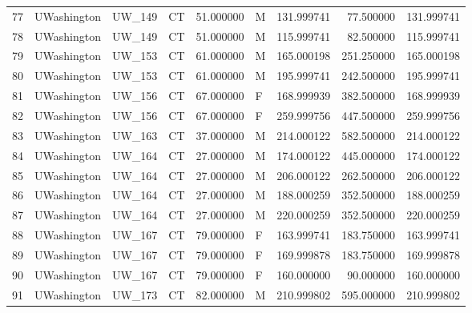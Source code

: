 \begin{tabular}{llllrlrrr}
77     &     UWashington &       UW\_149 &                 CT &  51.000000 &        M &       131.999741 &     77.500000 &  131.999741 \\
78     &     UWashington &       UW\_149 &                 CT &  51.000000 &        M &       115.999741 &     82.500000 &  115.999741 \\
79     &     UWashington &       UW\_153 &                 CT &  61.000000 &        M &       165.000198 &    251.250000 &  165.000198 \\
80     &     UWashington &       UW\_153 &                 CT &  61.000000 &        M &       195.999741 &    242.500000 &  195.999741 \\
81     &     UWashington &       UW\_156 &                 CT &  67.000000 &        F &       168.999939 &    382.500000 &  168.999939 \\
82     &     UWashington &       UW\_156 &                 CT &  67.000000 &        F &       259.999756 &    447.500000 &  259.999756 \\
83     &     UWashington &       UW\_163 &                 CT &  37.000000 &        M &       214.000122 &    582.500000 &  214.000122 \\
84     &     UWashington &       UW\_164 &                 CT &  27.000000 &        M &       174.000122 &    445.000000 &  174.000122 \\
85     &     UWashington &       UW\_164 &                 CT &  27.000000 &        M &       206.000122 &    262.500000 &  206.000122 \\
86     &     UWashington &       UW\_164 &                 CT &  27.000000 &        M &       188.000259 &    352.500000 &  188.000259 \\
87     &     UWashington &       UW\_164 &                 CT &  27.000000 &        M &       220.000259 &    352.500000 &  220.000259 \\
88     &     UWashington &       UW\_167 &                 CT &  79.000000 &        F &       163.999741 &    183.750000 &  163.999741 \\
89     &     UWashington &       UW\_167 &                 CT &  79.000000 &        F &       169.999878 &    183.750000 &  169.999878 \\
90     &     UWashington &       UW\_167 &                 CT &  79.000000 &        F &       160.000000 &     90.000000 &  160.000000 \\
91     &     UWashington &       UW\_173 &                 CT &  82.000000 &        M &       210.999802 &    595.000000 &  210.999802 \\

\end{tabular}
